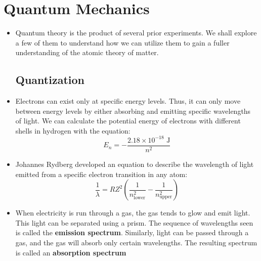 \documentclass{article}
\begin{document}
\maketitle

\tableofcontents
\newpage

\section{Quantum Mechanics}
\begin{itemize}
    \item Quantum theory is the product of several prior experiments. We shall explore a few of them to understand how we can utilize them to gain a fuller understanding of the atomic theory of matter. 
    \subsection{Quantization}
    \item Electrons can exist only at specific energy levels. Thus, it can only move between energy levels by either absorbing and emitting specific wavelengths of light. We can calculate the potential energy of electrons with different shells in hydrogen with the equation:
    $$
        E_n = -\frac{2.18\times 10^{-18} \text{ J}}{n^2}
    $$
    \item Johannes Rydberg developed an equation to describe the wavelength of light emitted from a specific electron transition in any atom:
    $$
        \frac{1}{\lambda} = RZ^2\left(\frac{1}{n^2_\text{lower}}-\frac{1}{n^2_\text{upper}}\right)
    $$
    \item When electricity is run through a gas, the gas tends to glow and emit light. This light can be separated using a prism. The sequence of wavelengths seen is called the \textbf{emission spectrum}. Similarly, light can be passed through a gas, and the gas will absorb only certain wavelengths. The resulting spectrum is called an \textbf{absorption spectrum}

\end{itemize}
\end{document}
